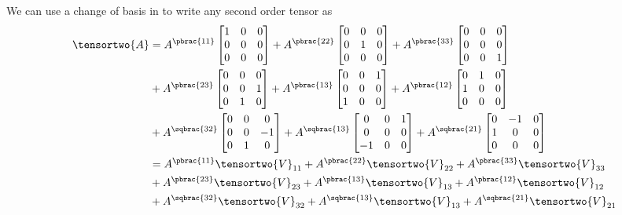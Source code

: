 We can use a change of basis in  to write any second order tensor as
\begin{equation}
  \begin{aligned}  
    \tensortwo{A}&=A^{\pbrac{11}}\begin{bmatrix} 1 & 0 & 0 \\ 0 & 0 & 0 \\ 0 & 0 & 0 \end{bmatrix}
    +A^{\pbrac{22}}\begin{bmatrix} 0 & 0 & 0 \\ 0 & 1 & 0 \\ 0 & 0 & 0 \end{bmatrix}
    +A^{\pbrac{33}}\begin{bmatrix} 0 & 0 & 0 \\ 0 & 0 & 0 \\ 0 & 0 & 1 \end{bmatrix} \\
    &+A^{\pbrac{23}}\begin{bmatrix} 0 & 0 & 0 \\ 0 & 0 & 1 \\ 0 & 1 & 0 \end{bmatrix}
    +A^{\pbrac{13}}\begin{bmatrix} 0 & 0 & 1 \\ 0 & 0 & 0 \\ 1 & 0 & 0 \end{bmatrix}
    +A^{\pbrac{12}}\begin{bmatrix} 0 & 1 & 0 \\ 1 & 0 & 0 \\ 0 & 0 & 0 \end{bmatrix} \\
    &+A^{\sqbrac{32}}\begin{bmatrix} 0 & 0 & 0 \\ 0 & 0 & -1 \\ 0 & 1 & 0 \end{bmatrix}
    +A^{\sqbrac{13}}\begin{bmatrix} 0 & 0 & 1 \\ 0 & 0 & 0 \\ -1 & 0 & 0 \end{bmatrix}
    +A^{\sqbrac{21}}\begin{bmatrix} 0 & -1 & 0 \\ 1 & 0 & 0 \\ 0 & 0 & 0 \end{bmatrix} \\
    &=A^{\pbrac{11}}\tensortwo{V}_{11}+A^{\pbrac{22}}\tensortwo{V}_{22}+A^{\pbrac{33}}\tensortwo{V}_{33} \\
    &+A^{\pbrac{23}}\tensortwo{V}_{23}+A^{\pbrac{13}}\tensortwo{V}_{13}+A^{\pbrac{12}}\tensortwo{V}_{12} \\
    &+A^{\sqbrac{32}}\tensortwo{V}_{32}+A^{\sqbrac{13}}\tensortwo{V}_{13}+A^{\sqbrac{21}}\tensortwo{V}_{21}
  \end{aligned}
  \label{eqn:VoigtNotationSecondOrderTensorVoigtBasis}
\end{equation}

